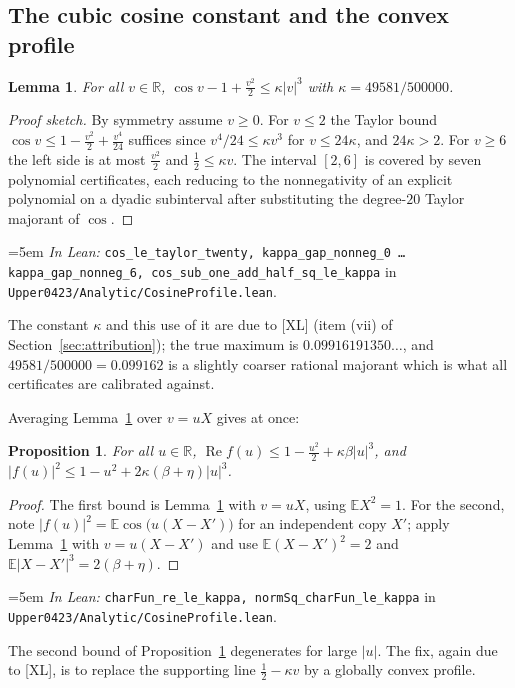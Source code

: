 \documentclass[11pt,a4paper]{article}
\newtheorem{proposition}[theorem]{Proposition}
\newtheorem{lemma}[theorem]{Lemma}
\theoremstyle{definition}
\newcommand{\RR}{\mathbb{R}}
\newcommand{\EE}{\mathbb{E}}
\newcommand{\kap}{\kappa}
\newcommand{\Lean}[1]{\texttt{#1}}
\newcommand{\file}[1]{\texttt{#1}}
\newcommand{\formal}[2]{%
  \par\smallskip
  \begingroup\small\raggedright\emergencystretch=5em
  \noindent\textit{In Lean:} \Lean{#1} in \file{#2}.\par
  \endgroup\smallskip}
\begin{document}
\subsection{The cubic cosine constant and the convex profile}
\label{sec:kappa}

\begin{lemma}
  \label{lem:kappa}
  For all $v\in\RR$, $\cos v-1+\tfrac{v^2}2\le \kap|v|^3$ with
  $\kap=49581/500000$.
\end{lemma}

\begin{proof}[Proof sketch]
  By symmetry assume $v\ge0$. For $v\le2$ the Taylor bound
  $\cos v\le1-\tfrac{v^2}2+\tfrac{v^4}{24}$ suffices since $v^4/24\le\kap v^3$
  for $v\le24\kap$, and $24\kap>2$. For $v\ge6$ the left side is at most
  $\tfrac{v^2}2$ and $\tfrac12\le\kap v$. The interval $[2,6]$ is covered by
  seven polynomial certificates, each reducing to the nonnegativity of an
  explicit polynomial on a dyadic subinterval after substituting the degree-$20$
  Taylor majorant of $\cos$.
\end{proof}
\formal{cos\_le\_taylor\_twenty, kappa\_gap\_nonneg\_0 \dots kappa\_gap\_nonneg\_6, cos\_sub\_one\_add\_half\_sq\_le\_kappa}{Upper0423/Analytic/CosineProfile.lean}

The constant $\kap$ and this use of it are due to [XL] (item (vii) of
Section~\ref{sec:attribution}); the true maximum is
$0.09916191350\ldots$, and $49581/500000=0.099162$ is a slightly coarser rational
majorant which is what all certificates are calibrated against.

Averaging Lemma~\ref{lem:kappa} over $v=uX$ gives at once:

\begin{proposition}
  \label{prop:rekappa}
  For all $u\in\RR$,
  $\operatorname{Re}f(u)\le1-\tfrac{u^2}2+\kap\beta|u|^3$, and
  $|f(u)|^2\le1-u^2+2\kap(\beta+\eta)|u|^3$.
\end{proposition}

\begin{proof}
  The first bound is Lemma~\ref{lem:kappa} with $v=uX$, using $\EE X^2=1$. For
  the second, note $|f(u)|^2=\EE\cos\bigl(u(X-X')\bigr)$ for an independent copy
  $X'$; apply Lemma~\ref{lem:kappa} with $v=u(X-X')$ and use
  $\EE(X-X')^2=2$ and $\EE|X-X'|^3=2(\beta+\eta)$.
\end{proof}
\formal{charFun\_re\_le\_kappa, normSq\_charFun\_le\_kappa}{Upper0423/Analytic/CosineProfile.lean}

The second bound of Proposition~\ref{prop:rekappa} degenerates for large $|u|$.
The fix, again due to [XL], is to replace the supporting line
$\tfrac12-\kap v$ by a globally convex profile.
\end{document}
